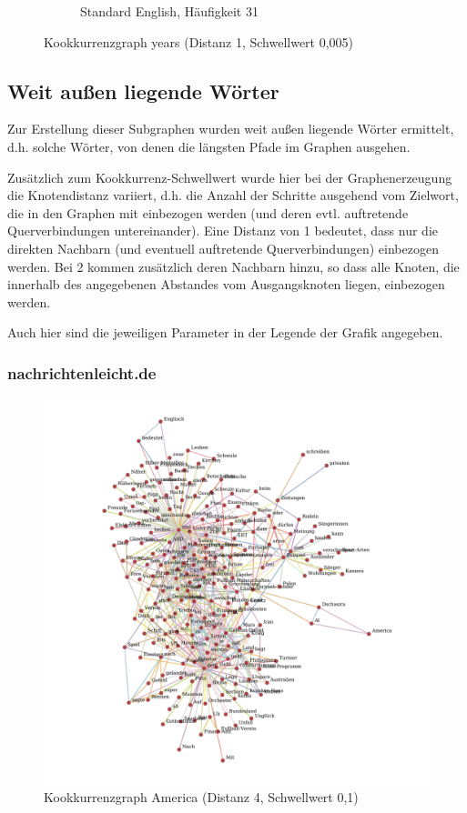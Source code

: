 \documentclass[11pt, a4paper]{article}
\begin{document}
\begin{figure}[hp!]
\begin{subfigure}[b]{0.5\textwidth}
        \caption{Standard English, Häufigkeit 31}
    \end{subfigure}
    \caption{Kookkurrenzgraph years (Distanz 1, Schwellwert 0,005)}
    \label{fig:hw-years}
\end{figure}


\pagebreak
\subsection{Weit außen liegende Wörter}
\label{sec:aussen_liegende}

Zur Erstellung dieser Subgraphen wurden weit außen liegende Wörter ermittelt,
d.h. solche Wörter, von denen die längsten Pfade im Graphen ausgehen.

Zusätzlich zum Kookkurrenz-Schwellwert wurde hier bei der Graphenerzeugung
die Knotendistanz variiert, d.h. die Anzahl der Schritte ausgehend vom Zielwort,
die in den Graphen mit einbezogen werden (und deren evtl. auftretende
Querverbindungen untereinander).
Eine Distanz von 1 bedeutet, dass nur die direkten Nachbarn (und eventuell
auftretende Querverbindungen) einbezogen werden. Bei 2 kommen zusätzlich deren
Nachbarn hinzu, so dass alle Knoten, die innerhalb des angegebenen Abstandes vom
Ausgangsknoten liegen, einbezogen werden.

Auch hier sind die jeweiligen Parameter in der Legende der Grafik angegeben.

\subsubsection{nachrichtenleicht.de}

\begin{figure}[hp!]
    \centering
        \includegraphics[scale=.4]{../../data/results/longpath_wordgraphs/nl/graph_America.pdf}
    \caption{Kookkurrenzgraph America (Distanz 4, Schwellwert 0,1)}
    \label{fig:lp-america}
\end{figure}
\end{document}

